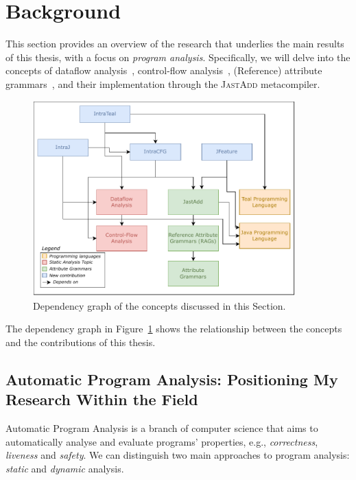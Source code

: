 \section{Background}%
\label{sec:background}
This section provides an overview of the research that underlies the main results
of this thesis, with a focus on \emph{program analysis}. Specifically, we will delve into
the concepts of dataflow analysis~\cite{aho2007compilers,Nielson2010Principles},
control-flow analysis~\cite{allen1970control}, (Reference) attribute grammars~\cite{knuth1968semantics, DBLP:journals/informaticaSI/Hedin00},
and their implementation through the \textsc{JastAdd} metacompiler.

\usetikzlibrary{backgrounds}
\begin{figure}[h]
    \centering
    \includegraphics[width=0.9\textwidth]{kappa/img/Dependencies.pdf}
  \caption{\label{fig:dependencygraph}Dependency graph of the concepts discussed in this Section.}
\end{figure}
The dependency graph in Figure~\ref{fig:dependencygraph} shows the relationship between
the concepts and the contributions of this thesis.

\subsection{Automatic Program Analysis: Positioning My Research Within the Field}
Automatic Program Analysis is a branch of computer science that aims to automatically
analyse and evaluate programs' properties, e.g., \emph{correctness}, \emph{liveness} and \emph{safety}. We can distinguish two main
approaches to program analysis: \emph{static} and \emph{dynamic} analysis.

